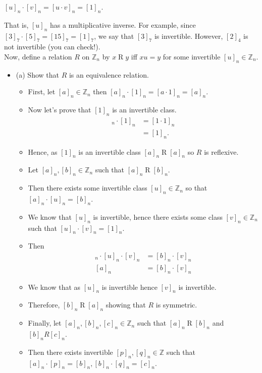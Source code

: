 \documentclass[letterpaper,12pt]{article}
\begin{document}
\begin{enumerate}
\begin{center}
$[u]_n \cdot [v]_n = [u \cdot v]_n = [1]_n$.	
\end{center}
That is, $[u]_n$ has a multiplicative inverse. For example, since $[3]_7 \cdot [5]_7 = [15]_7 = [1]_7$, we say that $[3]_7$ is invertible. However, $[2]_4$ is not invertible (you can check!).\\
Now, define a relation $R$ on $\mathbb{Z}_n$ by $x \mathrel R y$ iff $xu =y$ for some invertible $[u]_n \in \mathbb{Z}_n$.
\begin{itemize}
	\item (a) Show that $R$ is an equivalence relation.
	\begin{itemize}
	\item First, let $[a]_n \in \mathbb{Z}_n$ then $[a]_n \cdot [1]_n = [a \cdot 1]_n = [a]_n$.
	\item Now let's prove that $[1]_n$ is an invertible class.
	\begin{align}
	[1]_n \cdot [1]_n &= [1\cdot 1]_n \\&=[1]_n.	
	\end{align}
	\item Hence, as $[1]_n$ is an invertible class $[a]_n \mathrel R [a]_n$ so $R$ is reflexive.
	\item Let $[a]_n,[b]_n \in \mathbb{Z}_n$ such that $[a]_n \mathrel R [b]_n$.
	\item Then there exists some invertible class $[u]_n \in \mathbb{Z}_n$ so that $[a]_n \cdot [u]_n = [b]_n$.
	\item We know that $[u]_n$ is invertible, hence there exists some class $[v]_n \in \mathbb{Z}_n$ such that $[u]_n \cdot [v]_n = [1]_n$.
	\item Then 
	\begin{align}
		[a]_n \cdot [u]_n \cdot [v]_n &= [b]_n \cdot [v]_n \\
		[a]_n &= [b]_n \cdot [v]_n
	\end{align} 
	\item We know that as $[u]_n$ is invertible hence $[v]_n$ is invertible.
	\item Therefore, $[b]_n \mathrel R [a]_n$ showing that $R$ is symmetric.
	\item Finally, let $[a]_n,[b]_n,[c]_n \in \mathbb{Z}_n$ such that $[a]_n \mathrel R [b]_n $ and $[b]_n R [c]_n$.
	\item Then there exists invertible $[p]_n,[q]_n \in \mathbb {Z}$ such that $[a]_n \cdot [p]_n = [b]_n,[b]_n \cdot [q]_n = [c]_n$.
	\begin{align}

\end{align}
\end{itemize}
\end{itemize}
\end{enumerate}
\end{document}
